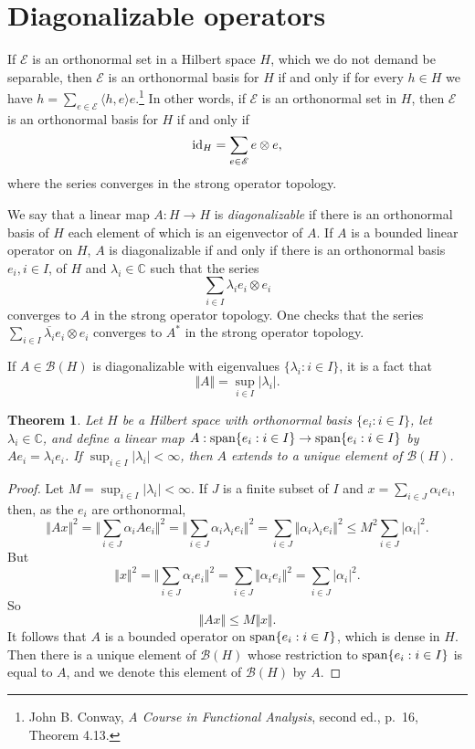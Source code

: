 \documentclass{article}
\newcommand{\inner}[2]{\langle #1, #2 \rangle}
\newcommand{\Span}{\ensuremath\mathrm{span}}
\newcommand{\id}{\ensuremath\mathrm{id}}
\newcommand{\norm}[1]{\Vert #1 \Vert}
\newtheorem{theorem}{Theorem}
\begin{document}
\section{Diagonalizable operators}
\label{diagonalizable}
If $\mathscr{E}$ is an orthonormal set in a Hilbert space $H$, which  we do not demand  be separable, then $\mathscr{E}$ is an orthonormal basis for $H$ if and only if for every $h \in H$ we have 
$h=\sum_{e \in \mathscr{E}} \inner{h}{e}e$.\footnote{John B. Conway, {\em A Course in Functional Analysis}, second ed., p.~16, Theorem 4.13.}
In other words, if $\mathscr{E}$ is an orthonormal set in $H$, then $\mathscr{E}$ is an orthonormal basis for $H$ if and only if
\[
\id_H = \sum_{e \in \mathscr{E}} e \otimes e,
\]
where the series converges in the strong operator topology. 


We say that a linear map $A:H \to H$ is {\em diagonalizable} if there is an orthonormal basis of $H$ each element of which is an eigenvector of $A$. 
If $A$ is a bounded linear operator on $H$, $A$ is diagonalizable if and only
if there is an orthonormal basis $e_i, i \in I$, of $H$ and
$\lambda_i \in \mathbb{C}$ such that the series
\[
\sum_{i \in I} \lambda_i e_i \otimes e_i
\]
converges to $A$ in the strong operator topology.  One checks that the series $\sum_{i \in I} \overline{\lambda_i} e_i \otimes e_i$ converges to $A^*$ in the strong
operator topology.

If
$A \in \mathscr{B}(H)$ is diagonalizable with eigenvalues $\{\lambda_i: i \in I\}$, it is a fact that
\begin{equation}
\norm{A}=\sup_{i \in I} |\lambda_i|.
\label{diagonalnorm}
\end{equation}

\begin{theorem}
Let  $H$ be a Hilbert space with orthonormal basis $\{e_i: i \in I\}$, let $\lambda_i \in \mathbb{C}$,
and define a linear map  $A:\Span\{e_i: i \in I\} \to \Span\{e_i: i \in I\}$ by $Ae_i = \lambda_i e_i$.  
If $\sup_{i \in I} |\lambda_i| < \infty$, then $A$ extends to a unique element of $\mathscr{B}(H)$.
\end{theorem}
\begin{proof}
Let $M=\sup_{i \in I} |\lambda_i| < \infty$.
If $J$ is a finite subset of $I$ and $x=\sum_{i \in J} \alpha_i e_i$, then, as the $e_i$ are orthonormal,
\[
\norm{Ax}^2=\norm{\sum_{i \in J} \alpha_i Ae_i}^2 = \norm{\sum_{i \in J} \alpha_i \lambda_i e_i}^2
=\sum_{i \in J} \norm{\alpha_i \lambda_i e_i}^2 \leq M^2 \sum_{i \in J} |\alpha_i|^2.
\]
But
\[
\norm{x}^2 = \norm{\sum_{i \in J} \alpha_i e_i}^2 =\sum_{i \in J} \norm{\alpha_i e_i}^2= \sum_{i \in J} |\alpha_i|^2.
\]
So
\[
\norm{Ax} \leq M \norm{x}.
\]
It follows that $A$ is a bounded operator on $\Span\{e_i:i \in I\}$,
which is dense in $H$. Then there is a unique element of $\mathscr{B}(H)$ whose
restriction to $\Span\{e_i: i \in I\}$ is equal to $A$, and we denote this element of $\mathscr{B}(H)$ by $A$.
\end{proof}
\end{document}
